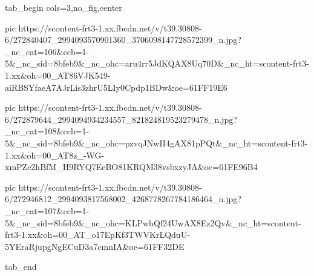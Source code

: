  
 
 
 
 


\ifcmt
  tab_begin cols=3,no_fig,center

     pic https://scontent-frt3-1.xx.fbcdn.net/v/t39.30808-6/272840407_2994093570901360_3706098147728572399_n.jpg?_nc_cat=106&ccb=1-5&_nc_sid=8bfeb9&_nc_ohc=aru4rr5JdKQAX8Uq70D&_nc_ht=scontent-frt3-1.xx&oh=00_AT86VJK549-aiRBSYfaeA7AJrLis3zhrU5LIy0Cpdp1BDw&oe=61FF19E6

     pic https://scontent-frt3-1.xx.fbcdn.net/v/t39.30808-6/272879644_2994094934234557_821824819523279478_n.jpg?_nc_cat=108&ccb=1-5&_nc_sid=8bfeb9&_nc_ohc=pzvqJNwII4gAX81pPQt&_nc_ht=scontent-frt3-1.xx&oh=00_AT8z_-WG-xmPZe2hBfM_H9RYQ7EeBO81KRQM38vsbxzyJA&oe=61FE96B4

     pic https://scontent-frt3-1.xx.fbcdn.net/v/t39.30808-6/272946812_2994093817568002_4268778267784186464_n.jpg?_nc_cat=107&ccb=1-5&_nc_sid=8bfeb9&_nc_ohc=KLPwbQf24UwAX8Ez2Qv&_nc_ht=scontent-frt3-1.xx&oh=00_AT_o17EpKf3TWVKrLQduU-5YEraRjupgNgECuD3a7cmnIA&oe=61FF32DE

  tab_end
\fi
